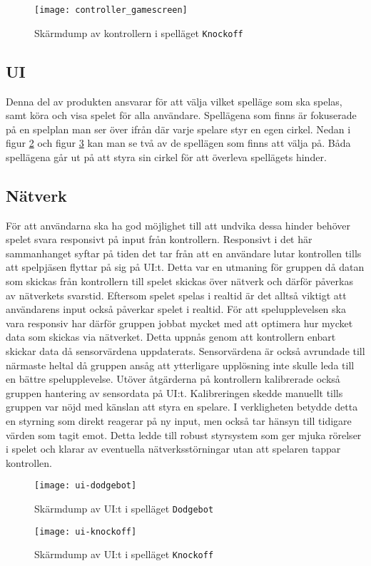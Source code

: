 \begin{figure}[h]
    \centering
    \texttt{[image: controller\_gamescreen]}
    \caption{Skärmdump av kontrollern i spelläget \texttt{Knockoff}}
    \label{fig:controller_gamescreen}
\end{figure}

\subsection{UI}
Denna del av produkten ansvarar för att välja vilket spelläge som ska spelas, samt köra och visa spelet för alla användare. Spellägena som finns är fokuserade på en spelplan man ser över ifrån där varje spelare styr en egen cirkel. Nedan i figur \ref{fig:ui-dodgebot} och figur \ref{fig:ui-knockoff} kan man se två av de spellägen som finns att välja på. Båda spellägena går ut på att styra sin cirkel för att överleva spellägets hinder. 

\subsection{Nätverk}
För att användarna ska ha god möjlighet till att undvika dessa hinder behöver spelet svara responsivt på input från kontrollern. Responsivt i det här sammanhanget syftar på tiden det tar från att en användare lutar kontrollen tills att spelpjäsen flyttar på sig på UI:t. Detta var en utmaning för gruppen då datan som skickas från kontrollern till spelet skickas över nätverk och därför påverkas av nätverkets svarstid. Eftersom spelet spelas i realtid är det alltså viktigt att användarens input också påverkar spelet i realtid. För att spelupplevelsen ska vara responsiv har därför gruppen jobbat mycket med att optimera hur mycket data som skickas via nätverket. Detta uppnås genom att kontrollern enbart skickar data då sensorvärdena uppdaterats. Sensorvärdena är också avrundade till närmaste heltal då gruppen ansåg att ytterligare upplösning inte skulle leda till en bättre spelupplevelse. Utöver åtgärderna på kontrollern kalibrerade också gruppen hantering av sensordata på UI:t. Kalibreringen skedde manuellt tills gruppen var nöjd med känslan att styra en spelare. I verkligheten betydde detta en styrning som direkt reagerar på ny input, men också tar hänsyn till tidigare värden som tagit emot. Detta ledde till robust styrsystem som ger mjuka rörelser i spelet och klarar av eventuella nätverksstörningar utan att spelaren tappar kontrollen. 

\begin{figure}[h]
    \centering
    \texttt{[image: ui-dodgebot]}
    \caption{Skärmdump av UI:t i spelläget \texttt{Dodgebot}}
    \label{fig:ui-dodgebot}
\end{figure}

\begin{figure}[h]
    \centering
    \texttt{[image: ui-knockoff]}
    \caption{Skärmdump av UI:t i spelläget \texttt{Knockoff}}
    \label{fig:ui-knockoff}
\end{figure}

